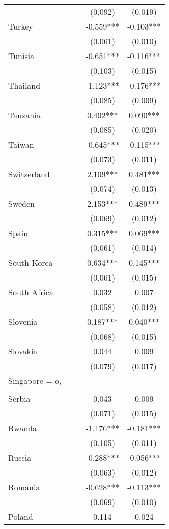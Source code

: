 \documentclass[]{article}
\begin{document}
\begin{tabular}{lcccc}
 &  &  & (0.092) & (0.019) \\
Turkey &  &  & -0.559*** & -0.103*** \\
 &  &  & (0.061) & (0.010) \\
Tunisia &  &  & -0.651*** & -0.116*** \\
 &  &  & (0.103) & (0.015) \\
Thailand &  &  & -1.123*** & -0.176*** \\
 &  &  & (0.085) & (0.009) \\
Tanzania &  &  & 0.402*** & 0.090*** \\
 &  &  & (0.085) & (0.020) \\
Taiwan &  &  & -0.645*** & -0.115*** \\
 &  &  & (0.073) & (0.011) \\
Switzerland &  &  & 2.109*** & 0.481*** \\
 &  &  & (0.074) & (0.013) \\
Sweden &  &  & 2.153*** & 0.489*** \\
 &  &  & (0.069) & (0.012) \\
Spain &  &  & 0.315*** & 0.069*** \\
 &  &  & (0.061) & (0.014) \\
South Korea &  &  & 0.634*** & 0.145*** \\
 &  &  & (0.061) & (0.015) \\
South Africa &  &  & 0.032 & 0.007 \\
 &  &  & (0.058) & (0.012) \\
Slovenia &  &  & 0.187*** & 0.040*** \\
 &  &  & (0.068) & (0.015) \\
Slovakia &  &  & 0.044 & 0.009 \\
 &  &  & (0.079) & (0.017) \\
Singapore = o, &  &  & - &  \\
 &  &  &  &  \\
Serbia &  &  & 0.043 & 0.009 \\
 &  &  & (0.071) & (0.015) \\
Rwanda &  &  & -1.176*** & -0.181*** \\
 &  &  & (0.105) & (0.011) \\
Russia &  &  & -0.288*** & -0.056*** \\
 &  &  & (0.063) & (0.012) \\
Romania &  &  & -0.628*** & -0.113*** \\
 &  &  & (0.069) & (0.010) \\
Poland &  &  & 0.114 & 0.024 \\

\end{tabular}
\end{document}
